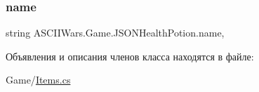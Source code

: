 \subsubsection{\texorpdfstring{name}{name}}
{\footnotesize\ttfamily string A\+S\+C\+I\+I\+Wars.\+Game.\+J\+S\+O\+N\+Health\+Potion.\+name\hspace{0.3cm}{\ttfamily [get]}, {\ttfamily [set]}}



Объявления и описания членов класса находятся в файле\+:\begin{DoxyCompactItemize}
\item 
Game/\hyperlink{_items_8cs}{Items.\+cs}\end{DoxyCompactItemize}

